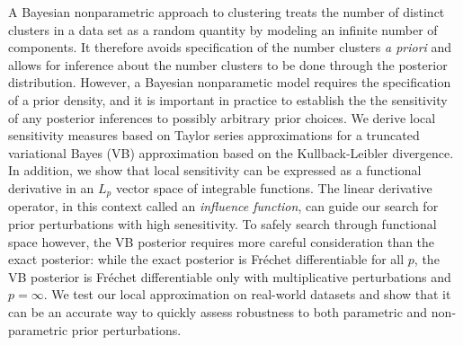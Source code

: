 A Bayesian nonparametric approach to clustering treats the number of distinct
clusters in a data set as a random quantity by modeling an infinite number of
components.  It therefore avoids specification of the number clusters \textit{a
priori} and allows for inference about the number clusters to be done through
the posterior distribution. However, a Bayesian nonparametic model requires the
specification of a prior density, and it is important in practice to
establish the the sensitivity of any posterior inferences to possibly arbitrary
prior choices. We derive local sensitivity measures based on Taylor series
approximations for a truncated variational Bayes (VB) approximation based on the
Kullback-Leibler divergence. In addition, we show that local sensitivity can be
expressed as a functional derivative in an $L_p$ vector space of integrable
functions. The linear derivative operator, in this context called an
\textit{influence function}, can guide our search for prior perturbations with
high senesitivity. To safely search through functional space however, the VB
posterior requires more careful consideration than the exact posterior: while
the exact posterior is Fr{\'e}chet differentiable for all $p$, the VB posterior
is Fr{\'e}chet differentiable only with multiplicative perturbations and
$p=\infty$. We test our local approximation on real-world datasets and show that
it can be an accurate way to quickly assess robustness to both parametric and
non-parametric prior perturbations.










